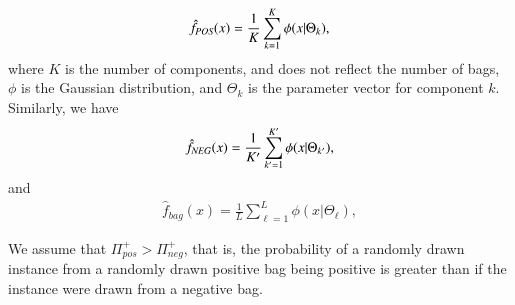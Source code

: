 \begin{align}
  \hat{f}_{\text{\scriptsize{{\it POS}}}}(x) = \frac{1}{K}\sum_{k = 1}^K  \phi(x|\Theta_k), 
\end{align}
where $K$ is the number of components, and does not reflect the number of bags, $\phi$ is the Gaussian distribution, and $\Theta_k$ is the parameter vector for component $k$. 
Similarly, we have
\begin{align}
  \hat{f}_{\text{\scriptsize{{\it NEG}}}}(x) = \frac{1}{K'}\sum_{{k'} = 1}^{K'}  \phi(x|\Theta_{k'}), 
\end{align}
and
\begin{align}
  \hat{f}_{bag}(x) = \frac{1}{L}\sum_{\ell = 1}^{L}  \phi(x|\Theta_\ell), 
\end{align}




{\color{red} We assume that $\Pi_{pos}^+ > \Pi_{neg}^+$, that is, the probability of a randomly drawn instance from a randomly drawn positive bag being positive is greater than if the instance were drawn from a negative bag. }
